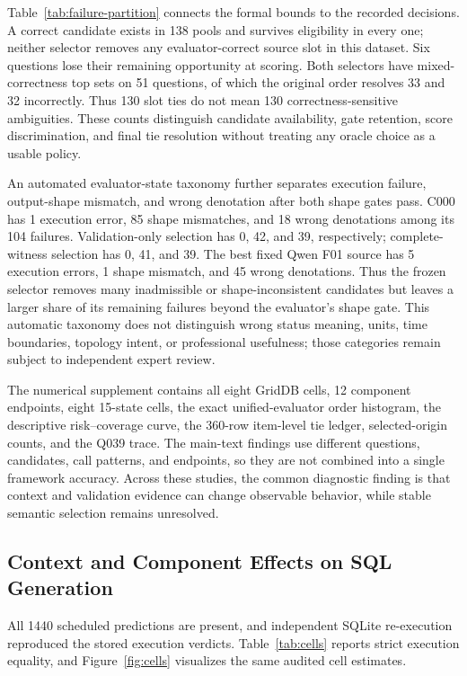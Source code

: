 \documentclass[information,article,submit,moreauthors]{Definitions/mdpi}
\begin{document}
Table~\ref{tab:failure-partition} connects the formal bounds to the recorded decisions. A correct candidate exists in 138 pools and survives eligibility in every one; neither selector removes any evaluator-correct source slot in this dataset. Six questions lose their remaining opportunity at scoring. Both selectors have mixed-correctness top sets on 51 questions, of which the original order resolves 33 and 32 incorrectly. Thus 130 slot ties do not mean 130 correctness-sensitive ambiguities. These counts distinguish candidate availability, gate retention, score discrimination, and final tie resolution without treating any oracle choice as a usable policy.

An automated evaluator-state taxonomy further separates execution failure, output-shape mismatch, and wrong denotation after both shape gates pass. C000 has 1 execution error, 85 shape mismatches, and 18 wrong denotations among its 104 failures. Validation-only selection has 0, 42, and 39, respectively; complete-witness selection has 0, 41, and 39. The best fixed Qwen F01 source has 5 execution errors, 1 shape mismatch, and 45 wrong denotations. Thus the frozen selector removes many inadmissible or shape-inconsistent candidates but leaves a larger share of its remaining failures beyond the evaluator's shape gate. This automatic taxonomy does not distinguish wrong status meaning, units, time boundaries, topology intent, or professional usefulness; those categories remain subject to independent expert review.

The numerical supplement contains all eight GridDB cells, 12 component endpoints, eight 15-state cells, the exact unified-evaluator order histogram, the descriptive risk--coverage curve, the 360-row item-level tie ledger, selected-origin counts, and the Q039 trace. The main-text findings use different questions, candidates, call patterns, and endpoints, so they are not combined into a single framework accuracy. Across these studies, the common diagnostic finding is that context and validation evidence can change observable behavior, while stable semantic selection remains unresolved.

\subsection{Context and Component Effects on SQL Generation}

All 1440 scheduled predictions are present, and independent SQLite re-execution reproduced the stored execution verdicts. Table~\ref{tab:cells} reports strict execution equality, and Figure~\ref{fig:cells} visualizes the same audited cell estimates.
\end{document}
